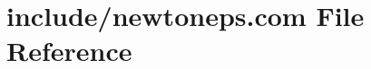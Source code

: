 \hypertarget{newtoneps_8com}{\section{include/newtoneps.com File Reference}
\label{newtoneps_8com}
}

